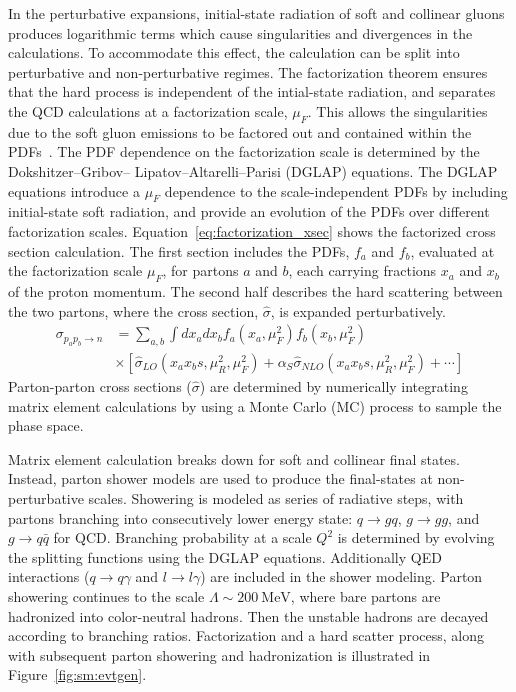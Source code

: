 In the perturbative expansions, initial-state radiation of soft and collinear gluons produces logarithmic terms which cause singularities and divergences in the calculations. To accommodate this effect, the calculation can be split into perturbative and non-perturbative regimes. The factorization theorem ensures that the hard process is independent of the intial-state radiation, and separates the QCD calculations at a factorization scale, $\mu_F$. This allows the singularities due to the soft gluon emissions to be factored out and contained within the PDFs~\cite{Collins:1989gx}. The PDF dependence on the factorization scale is determined by the Dokshitzer–Gribov– Lipatov–Altarelli–Parisi (DGLAP) equations. The DGLAP equations introduce a $\mu_F$ dependence to the scale-independent PDFs by including initial-state soft radiation, and provide an evolution of the PDFs over different factorization scales\cite{Gribov:1972ri,Dokshitzer:1977sg}.  Equation~\ref{eq:factorization_xsec} shows the factorized cross section calculation. The first section includes the PDFs, $f_{a}$ and $f_{b}$, evaluated at the factorization scale $\mu_F$, for partons $a$ and $b$, each carrying fractions $x_a$ and $x_b$ of the proton momentum. The second half describes the hard scattering between the two partons, where the cross section, $\hat{\sigma}$, is expanded perturbatively.  
\begin{equation}
\begin{aligned}
\sigma_{p_a p_b \rightarrow n} &= \sum_{a,b}{\int{dx_a dx_b f_{a}(x_a, \mu^2_F)f_{b}(x_b, \mu^2_F)}} \\ &\times[\hat{\sigma}_{LO}(x_a x_b s, \mu^2_R, \mu^2_F)+\alpha_S \hat{\sigma}_{NLO}(x_a x_b s, \mu^2_R, \mu^2_F) + \cdots]
    \label{eq:factorization_xsec}
\end{aligned}
\end{equation}
Parton-parton cross sections ($\hat{\sigma}$) are determined by numerically integrating matrix element calculations by using a Monte Carlo (MC) process to sample the phase space.

Matrix element calculation breaks down for soft and collinear final states. Instead, parton shower models are used to produce the final-states at non-perturbative scales. Showering is modeled as series of radiative steps, with partons branching into consecutively lower energy state: $q\rightarrow gq$, $g\rightarrow gg$, and $g\rightarrow q\bar{q}$ for QCD. Branching probability at a scale $Q^2$ is determined by evolving the splitting functions using the DGLAP equations. Additionally QED interactions ($q\rightarrow q\gamma$ and $l\rightarrow l\gamma$) are included in the shower modeling. Parton showering continues to the scale $\Lambda\sim 200~\mathrm{MeV}$, where bare partons are hadronized into color-neutral hadrons. Then the unstable hadrons are decayed according to branching ratios. Factorization and a hard scatter process, along with subsequent parton showering and hadronization is illustrated in Figure~\ref{fig:sm:evtgen}.

